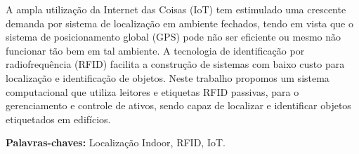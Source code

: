 \documentclass[
	12pt,				%
    oneside,			%
	a4paper,			%
	chapter=TITLE,		%
	english,			%
	brazil				%
	]{abntex2}
\begin{document}

\setlength{\absparsep}{18pt} %
\begin{resumo}[Resumo]
A ampla utilização da Internet das Coisas (IoT) tem estimulado uma crescente demanda por
sistema de localização em ambiente fechados, tendo em vista que o sistema de posicionamento global (GPS)
pode não ser eficiente ou mesmo não funcionar tão bem em tal ambiente. A tecnologia de identificação por radiofrequência (RFID) facilita a construção
de sistemas com baixo custo para localização e identificação de objetos. Neste trabalho propomos um sistema computacional
que utiliza leitores e etiquetas RFID passivas, para o gerenciamento e controle de ativos, sendo capaz de localizar e
identificar objetos etiquetados em edifícios.

 \vspace{\onelineskip}
 
 \noindent 
 \textbf{Palavras-chaves:} Localização Indoor, RFID, IoT.
\end{resumo}

%
% 
\renewcommand{\listfigurename}{Lista de Figuras}
\listoffigures*
\cleardoublepage

\renewcommand{\listtablename}{Lista de Tabelas}
\listoftables*
\cleardoublepage
\end{document}
